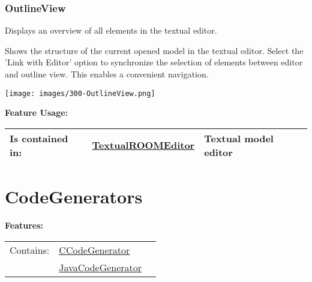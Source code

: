 		
	
	\vspace{\baselineskip}
	\vspace{\baselineskip}
	\vspace{\baselineskip}
	
\subsubsection{OutlineView}
	\hypertarget{ref:OutlineView}{}
	Displays an overview of all elements in the textual editor.
		
	Shows the structure of the current opened model in the textual editor. Select the 'Link with Editor' option to synchronize the selection of elements between editor and outline view. This enables a convenient navigation.
	
	\begin{center}
	\texttt{[image: images/300-OutlineView.png]}
	\end{center}
		
		
		
	\begingroup
	\textbf{Feature Usage:}
	\renewcommand{\arraystretch}{1.8} %
	\begin{longtable}{l|l p{}}
		\hline
	Is contained in: & \tabitem \hyperlink{ref:TextualROOMEditor}{TextualROOMEditor}  & Textual model editor\\
	\hline
	\end{longtable}
	\endgroup
		
	
	\vspace{\baselineskip}
	\vspace{\baselineskip}
	\vspace{\baselineskip}
	
\section{CodeGenerators}
	\hypertarget{ref:CodeGenerators}{}
	
	
	\begingroup
	\textbf{Features:}
	\renewcommand{\arraystretch}{1.8} %
	\begin{longtable}{l|l p{}}
		\hline
	Contains: & \tabitem \hyperlink{ref:CCodeGenerator}{CCodeGenerator}  & \\
	& \tabitem \hyperlink{ref:JavaCodeGenerator}{JavaCodeGenerator}  &  \\
	\hline
	\end{longtable}
	\endgroup
	
